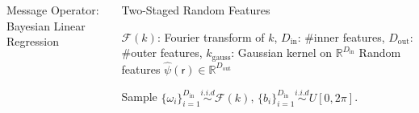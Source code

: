 \documentclass[english]{beamer}
\begin{document}
\begin{frame}
\begin{columns}[t]
\begin{block}{Message Operator: Bayesian Linear Regression }

%

\end{block}


\begin{block}{Two-Staged Random Features }
\begin{algorithmic}[1]
\REQUIRE 
$\mathscr{F}(k)$: Fourier transform of $k$, $D_\mathrm{in}$: \#inner features, 
$D_\mathrm{out}$: \#outer features, $k_\text{gauss}$: Gaussian kernel on
$\mathbb{R}^{D_\mathrm{in}}$
\ENSURE Random features $\hat{\psi}(\mathsf{r}) \in \mathbb{R}^{D_\mathrm{out}}$

\STATE Sample  $\{ \omega_i \}_{i=1}^{D_\mathrm{in}} \overset{i.i.d}{\sim} \mathscr{F}(k)$,
\hspace{2cm}
$\{b_i\}_{i=1}^{D_\mathrm{in}} \overset{i.i.d}{\sim} U[0, 2\pi] $.




\end{algorithmic}
\end{block}
\end{columns}
\end{frame}
\end{document}
